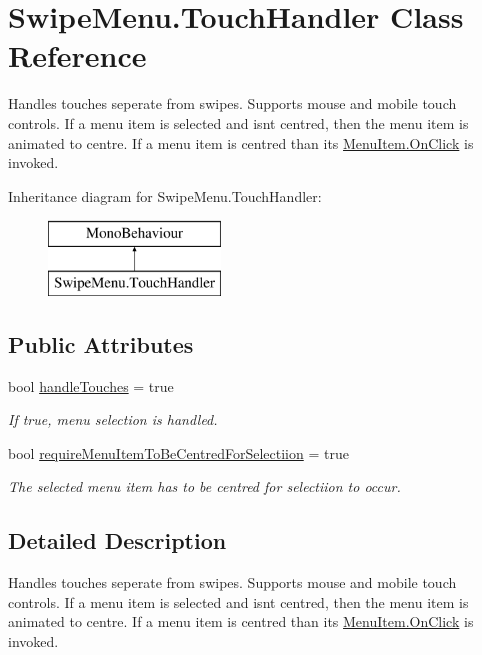 \hypertarget{class_swipe_menu_1_1_touch_handler}{}\section{Swipe\+Menu.\+Touch\+Handler Class Reference}
\label{class_swipe_menu_1_1_touch_handler}


Handles touches seperate from swipes. Supports mouse and mobile touch controls. If a menu item is selected and isn\textquotesingle{}t centred, then the menu item is animated to centre. If a menu item is centred than its \hyperlink{class_swipe_menu_1_1_menu_item_ad4e6de7e233b0bbce78a6451dcf96cfe}{Menu\+Item.\+On\+Click} is invoked.  


Inheritance diagram for Swipe\+Menu.\+Touch\+Handler\+:\begin{figure}[H]
\begin{center}
\leavevmode
\includegraphics[height=2.000000cm]{class_swipe_menu_1_1_touch_handler}
\end{center}
\end{figure}
\subsection*{Public Attributes}
\begin{DoxyCompactItemize}
\item 
bool \hyperlink{class_swipe_menu_1_1_touch_handler_abc83b20a8a5cb8926d36a365332f4bde}{handle\+Touches} = true
\begin{DoxyCompactList}\small\item\em If true, menu selection is handled. \end{DoxyCompactList}\item 
bool \hyperlink{class_swipe_menu_1_1_touch_handler_a5087c3be41a592cb074bab02aa08d3a3}{require\+Menu\+Item\+To\+Be\+Centred\+For\+Selectiion} = true
\begin{DoxyCompactList}\small\item\em The selected menu item has to be centred for selectiion to occur. \end{DoxyCompactList}\end{DoxyCompactItemize}


\subsection{Detailed Description}
Handles touches seperate from swipes. Supports mouse and mobile touch controls. If a menu item is selected and isn\textquotesingle{}t centred, then the menu item is animated to centre. If a menu item is centred than its \hyperlink{class_swipe_menu_1_1_menu_item_ad4e6de7e233b0bbce78a6451dcf96cfe}{Menu\+Item.\+On\+Click} is invoked. 




